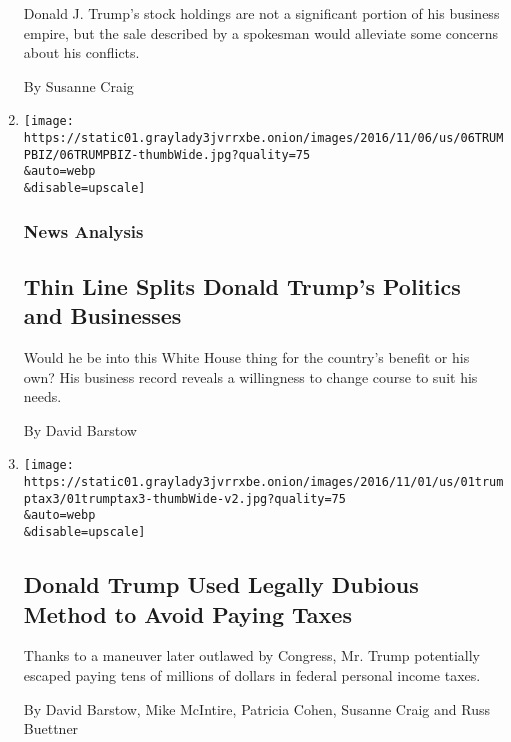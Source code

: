 \begin{enumerate}
  Donald J. Trump's stock holdings are not a significant portion of his
  business empire, but the sale described by a spokesman would alleviate
  some concerns about his conflicts.

  By Susanne Craig
\item
  \href{/2016/11/06/us/politics/donald-trump-business-tax-records.html}{}

  \texttt{[image: https://static01.graylady3jvrrxbe.onion/images/2016/11/06/us/06TRUMPBIZ/06TRUMPBIZ-thumbWide.jpg?quality=75\\\&auto=webp\\\&disable=upscale]}

  \hypertarget{news-analysis}{%
  \subsubsection{News Analysis}\label{news-analysis}}

  \hypertarget{thin-line-splits-donald-trumps-politics-and-businesses}{%
  \subsection{Thin Line Splits Donald Trump's Politics and
  Businesses}\label{thin-line-splits-donald-trumps-politics-and-businesses}}

  Would he be into this White House thing for the country's benefit or
  his own? His business record reveals a willingness to change course to
  suit his needs.

  By David Barstow
\item
  \href{/2016/11/01/us/politics/donald-trump-tax.html}{}

  \texttt{[image: https://static01.graylady3jvrrxbe.onion/images/2016/11/01/us/01trumptax3/01trumptax3-thumbWide-v2.jpg?quality=75\\\&auto=webp\\\&disable=upscale]}

  \hypertarget{donald-trump-used-legally-dubious-method-to-avoid-paying-taxes}{%
  \subsection{Donald Trump Used Legally Dubious Method to Avoid Paying
  Taxes}\label{donald-trump-used-legally-dubious-method-to-avoid-paying-taxes}}

  Thanks to a maneuver later outlawed by Congress, Mr. Trump potentially
  escaped paying tens of millions of dollars in federal personal income
  taxes.

  By David Barstow, Mike McIntire, Patricia Cohen, Susanne Craig and
  Russ Buettner
\end{enumerate}

